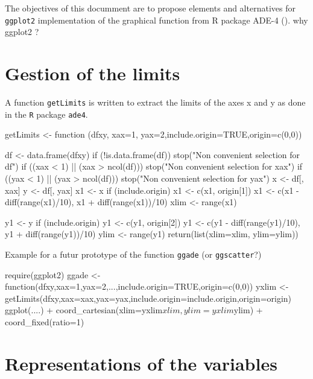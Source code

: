 \documentclass[a4paper,10pt]{article}
\begin{document}
The objectives of this documment are to propose elements and alternatives for \texttt{ggplot2} implementation of the graphical function from R package ADE-4 (\cite{ade4_2004,ade4_2007a,ade4_2007b}). why ggplot2 ?


\section{Gestion of the limits}

A function \texttt{getLimits} is written to extract the limits of the axes x and y as done in the \texttt{R} package \texttt{ade4}.

\begin{Schunk}
\begin{Sinput}
  getLimits <- function (dfxy, xax=1, yax=2,include.origin=TRUE,origin=c(0,0)){
 	df <- data.frame(dfxy)
 	if (!is.data.frame(df)) 
 		stop("Non convenient selection for df")
 	if ((xax < 1) || (xax > ncol(df))) 
 		stop("Non convenient selection for xax")
 	if ((yax < 1) || (yax > ncol(df))) 
 		stop("Non convenient selection for yax")
 	x <- df[, xax]
 	y <- df[, yax]
 	x1 <- x
 	if (include.origin) 
 		x1 <- c(x1, origin[1])
 	x1 <- c(x1 - diff(range(x1)/10), x1 + diff(range(x1))/10)
 	xlim <- range(x1)
 	
 	y1 <- y
 	if (include.origin) 
 		y1 <- c(y1, origin[2])
 	y1 <- c(y1 - diff(range(y1)/10), y1 + diff(range(y1))/10)
 	ylim <- range(y1)
 	return(list(xlim=xlim, ylim=ylim))
 }
\end{Sinput}
\end{Schunk}

Example for a futur prototype of the function \texttt{ggade} (or \texttt{ggscatter}?)

\begin{Schunk}
\begin{Sinput}
  require(ggplot2)
  ggade <- function(dfxy,xax=1,yax=2,...,include.origin=TRUE,origin=c(0,0)){
   yxlim <- getLimits(dfxy,xax=xax,yax=yax,include.origin=include.origin,origin=origin)
   ggplot(....) + coord_cartesian(xlim=yxlim$xlim,ylim=yxlim$ylim) + coord_fixed(ratio=1)
 }
\end{Sinput}
\end{Schunk}


\section{Representations of the variables}
\end{document}
